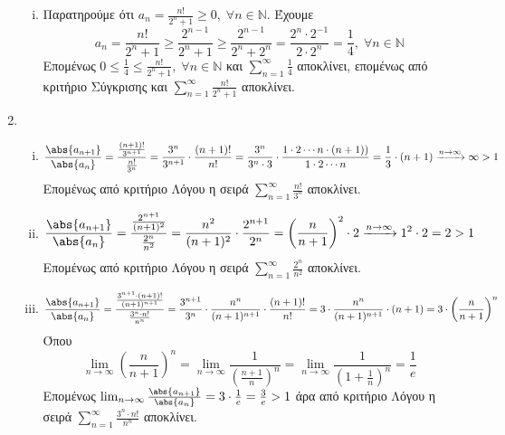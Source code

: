 \documentclass[a4paper,table]{report}
\begin{document}
\begin{enumerate}
\begin{enumerate}[i)]
      \item Παρατηρούμε ότι $ a_{n}= \frac{n!}{2^{n}+1} \geq 0, \; 
        \forall n \in \mathbb{N} $.  Έχουμε 
        \[
          a_{n} = \frac{n!}{2^{n}+1} \geq \frac{2^{n-1}}{2^{n}+1} \geq 
          \frac{2^{n-1}}{2^{n}+2^{n}} = 
          \frac{2^{n}\cdot 2^{-1}}{2\cdot 2^{n}} = \frac{1}{4}, 
          \; \forall n \in \mathbb{N}
        \] 
        Επομένως $ 0 \leq \frac{1}{4} \leq \frac{n!}{2^{n}+1}, \; 
        \forall n \in \mathbb{N}
        $ και $ \sum_{n=1}^{\infty} \frac{1}{4} $ αποκλίνει, επομένως από 
        κριτήριο Σύγκρισης και $ \sum_{n=1}^{\infty} \frac{n!}{2^{n}+1} $ 
        αποκλίνει.

    \end{enumerate} 

  \item 
    \begin{enumerate}[i)]
      \item 
        \[
          \frac{\abs{a_{n+1}}}{\abs{a_{n}}} = 
          \frac{\frac{(n+1)!}{3^{n+1}}}{\frac{n!}{3^{n}}} = 
          \frac{3^{n}}{3^{n+1}} \cdot
          \frac{(n+1)!}{n!} = \frac{3^{n}}{3^{n}\cdot 3} \cdot \frac{1 \cdot 2 
          \cdots n \cdot (n+1))}{1 \cdot 2 \cdots n} = \frac{1}{3} \cdot (n+1) 
          \xrightarrow{n \to \infty} \infty > 1
        \] 
        Επομένως από κριτήριο Λόγου η σειρά $ \sum_{n=1}^{\infty} 
        \frac{n!}{3^{n}}$ αποκλίνει. 

      \item 
        \[
          \frac{\abs{a_{n+1}}}{\abs{a_{n}}} = \frac{\frac{2^{n+1}}{(n+1)^{2}}}{
          \frac{2^{n}}{n^{2}}} = \frac{n^{2}}{(n+1)^{2}} \cdot 
          \frac{2^{n+1}}{2^{n}} =  \left(\frac{n}{n+1}\right)^{2} \cdot 2 
          \xrightarrow{n \to \infty} 1^{2}\cdot 2 = 2 > 1 
        \] 
        Επομένως από κριτήριο Λόγου η σειρά $ \sum_{n=1}^{\infty} 
        \frac{2^{n}}{n^{2}} $ αποκλίνει.

      \item 
        \[
          \frac{\abs{a_{n+1}}}{\abs{a_{n}}} = \frac{\frac{3^{n+1}\cdot (n+1)!}
          {(n+1)^{n+1}}}{\frac{3^{n}\cdot n!}{n^{n}}} = \frac{3^{n+1}}{3^{n}} 
          \cdot \frac{n^{n}}{(n+1)^{n+1}} \cdot \frac{(n+1)!}{n!} = 3 \cdot 
          \frac{n^{n}}{(n+1)^{n+1}} \cdot (n+1) = 3 \cdot \left(\frac{n}{n+1} 
          \right)^{n} 
        \] 
        Όπου 
        \[
          \lim_{n \to \infty} \left(\frac{n}{n+1} \right)^{n} = 
          \lim_{n \to \infty}\frac{1}{\left(\frac{n+1}{n}\right)^{n}} = 
          \lim_{n \to \infty} \frac{1}{(1 + \frac{1}{n})^{n}} = \frac{1}{e}
        \]
        Επομένως $ \lim_{n \to \infty} \frac{\abs{a_{n+1}}}{\abs{a_{n}}} = 
        3 \cdot \frac{1}{e} = \frac{3}{e} > 1$ άρα από κριτήριο Λόγου η σειρά 
        $ \sum_{n=1}^{\infty} \frac{3^{n}\cdot n!}{n^{n}} $ αποκλίνει.


\end{enumerate}
\end{enumerate}
\end{document}
